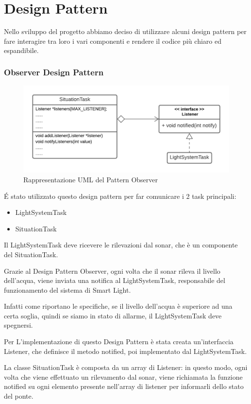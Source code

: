 \documentclass[a4paper,12pt]{report}
\begin{document}
\chapter{Design Pattern}



\par
Nello sviluppo del progetto abbiamo deciso di utilizzare alcuni design pattern per fare interagire tra loro i vari componenti e rendere il codice più chiaro ed espandibile.

\subsection{Observer Design Pattern}
\begin{figure}[H]
    \centering
    \includegraphics[width=13cm]{Observer.png}
    \caption{Rappresentazione UML del Pattern Observer}
\end{figure}
\'E stato utilizzato questo design pattern per far comunicare i 2 task principali:
\begin{itemize}
    \item LightSystemTask
    \item SituationTask
\end{itemize}

\par
Il LightSystemTask deve ricevere le  rilevazioni dal sonar, che è un componente del SituationTask.

\par
Grazie al Design Pattern Observer, ogni volta che il sonar rileva il livello dell'acqua, viene inviata una notifica al LightSystemTask, responsabile del funzionamento del sistema di Smart Light.

\par
Infatti come riportano le specifiche, se il livello dell'acqua è superiore ad una certa soglia, quindi se siamo in stato di allarme, il LightSystemTask deve spegnersi.
\par
Per L'implementazione di questo Design Pattern è stata creata un'interfaccia Listener, che definisce il metodo notified, poi implementato dal LightSystemTask.
\par
La classe SituationTask è composta da un array di Listener: in questo modo, ogni volta che viene effettuato un rilevamento dal sonar, viene richiamata la funzione notified su ogni elemento presente nell'array di listener per informarli dello stato del ponte.
\end{document}
